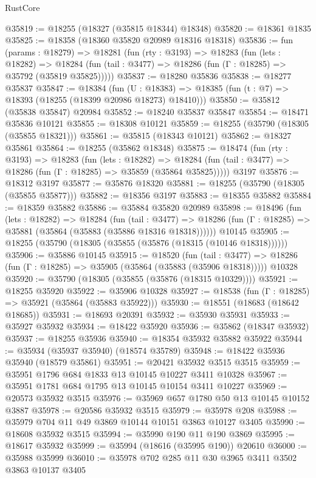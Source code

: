 \begin{lexlean}{RustCore}
\begin{coremodule}
@35819 := @18255 (@18327 (@35815 @18344) @18348)
@35820 := @18361 @1835
@35825 := @18358 (@18360 @35820 @20989 @18316 @18318)
@35836 := fun (params : @18279) =>
  @18281
    (fun (rty : @3193) =>
    @18283
      (fun (lets : @18282) =>
      @18284 (fun (tail : @3477) => @18286 (fun (Γ : @18285) => @35792 (@35819 @35825)))))
@35837 := @18280 @35836
@35838 := @18277 @35837
@35847 := @18384
    (fun (U : @18383) => @18385 (fun (t : @7) => @18393 (@18255 (@18399 @20986 @18273) @18410)))
@35850 := @35812 (@35838 @35847) @20984
@35852 := @18240 @35837 @35847
@35854 := @18471 @35836 @10121
@35855 := @18308 @10121
@35859 := @18255 (@35790 (@18305 (@35855 @18321)))
@35861 := @35815 (@18343 @10121)
@35862 := @18327 @35861
@35864 := @18255 (@35862 @18348)
@35875 := @18474
    (fun (rty : @3193) =>
    @18283
      (fun (lets : @18282) =>
      @18284 (fun (tail : @3477) => @18286 (fun (Γ : @18285) => @35859 (@35864 @35825)))))
    @3197
@35876 := @18312 @3197
@35877 := @35876 @18320
@35881 := @18255 (@35790 (@18305 (@35855 @35877)))
@35882 := @18356 @3197
@35883 := @18355 @35882
@35884 := @18359 @35882
@35886 := @35884 @35820 @20989
@35898 := @18496
    (fun (lets : @18282) =>
    @18284
      (fun (tail : @3477) =>
      @18286 (fun (Γ : @18285) => @35881 (@35864 (@35883 (@35886 @18316 @18318))))))
    @10145
@35905 := @18255 (@35790 (@18305 (@35855 (@35876 (@18315 (@10146 @18318))))))
@35906 := @35886 @10145
@35915 := @18520
    (fun (tail : @3477) => @18286 (fun (Γ : @18285) => @35905 (@35864 (@35883 (@35906 @18318)))))
    @10328
@35920 := @35790 (@18305 (@35855 (@35876 (@18315 @10329))))
@35921 := @18255 @35920
@35922 := @35906 @10328
@35927 := @18538 (fun (Γ : @18285) => @35921 (@35864 (@35883 @35922)))
@35930 := @18551 (@18683 (@18642 @18685))
@35931 := @18693 @20391
@35932 := @35930 @35931
@35933 := @35927 @35932
@35934 := @18422 @35920
@35936 := @35862 (@18347 @35932)
@35937 := @18255 @35936
@35940 := @18354 @35932 @35882 @35922
@35944 := @35934 (@35937 @35940) (@18574 @35789)
@35948 := @18422 @35936 @35940 (@18579 @35861)
@35951 := @20421 @35932 @3515 @3515
@35959 := @35951 @1796 @684 @1833 @13 @10145 @10227 @3411 @10328
@35967 := @35951 @1781 @684 @1795 @13 @10145 @10154 @3411 @10227
@35969 := @20573 @35932 @3515
@35976 := @35969 @657 @1780 @50 @13 @10145 @10152 @3887
@35978 := @20586 @35932 @3515
@35979 := @35978 @208
@35988 := @35979 @704 @11 @49 @3869 @10144 @10151 @3863 @10127 @3405
@35990 := @18608 @35932 @3515
@35994 := @35990 @190 @11 @190 @3869
@35995 := @18617 @35932
@35999 := @35994 (@18616 (@35995 @190)) @20610
@36000 := @35988 @35999
@36010 := @35978 @702 @285 @11 @30 @3965 @3411 @3502 @3863 @10137 @3405

\end{coremodule}
\end{lexlean}
